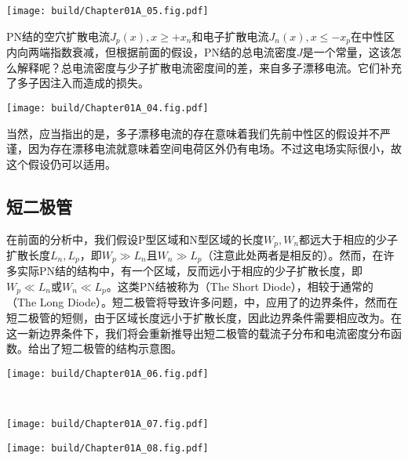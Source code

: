 \begin{Figure}
    \texttt{[image: build/Chapter01A\_05.fig.pdf]}
\end{Figure}

PN结的空穴扩散电流$J_p(x), x\geq +x_n$和电子扩散电流$J_n(x), x\leq -x_p$在中性区内向两端指数衰减，但根据前面的假设，PN结的总电流密度$J$是一个常量，这该怎么解释呢？总电流密度与少子扩散电流密度间的差，来自多子漂移电流。它们补充了多子因注入而造成的损失。

\begin{Figure}[PN结的电流密度分布]
    \texttt{[image: build/Chapter01A\_04.fig.pdf]}
\end{Figure}

当然，应当指出的是，多子漂移电流的存在意味着我们先前中性区的假设并不严谨，因为存在漂移电流就意味着空间电荷区外仍有电场。不过这电场实际很小，故这个假设仍可以适用。

\subsection{短二极管}
在前面的分析中，我们假设P型区域和N型区域的长度$W_p, W_n$都远大于相应的少子扩散长度$L_n, L_p$，即$W_p\gg L_n$且$W_n\gg L_p$（注意此处两者是相反的）。然而，在许多实际PN结的结构中，有一个区域，反而远小于相应的少子扩散长度，即$W_p\ll L_n$或$W_n\ll L_p$。这类PN结被称为（The Short Diode），相较于通常的（The Long Diode）。短二极管将导致许多问题，中，应用了的边界条件，然而在短二极管的短侧，由于区域长度远小于扩散长度，因此边界条件需要相应改为。在这一新边界条件下，我们将会重新推导出短二极管的载流子分布和电流密度分布函数。给出了短二极管的结构示意图。

\begin{Figure}[短二极管与长二极管]
    \begin{FigureSub}[长二极管]
        \texttt{[image: build/Chapter01A\_06.fig.pdf]}
    \end{FigureSub}\\ \vspace{0.5cm}
    \begin{FigureSub}[短二极管（N侧）]
        \texttt{[image: build/Chapter01A\_07.fig.pdf]}
    \end{FigureSub}\hspace{0.25cm}
    \begin{FigureSub}[短二极管（P侧）]
        \texttt{[image: build/Chapter01A\_08.fig.pdf]}
    \end{FigureSub}
\end{Figure}\vspace{0.15cm}

